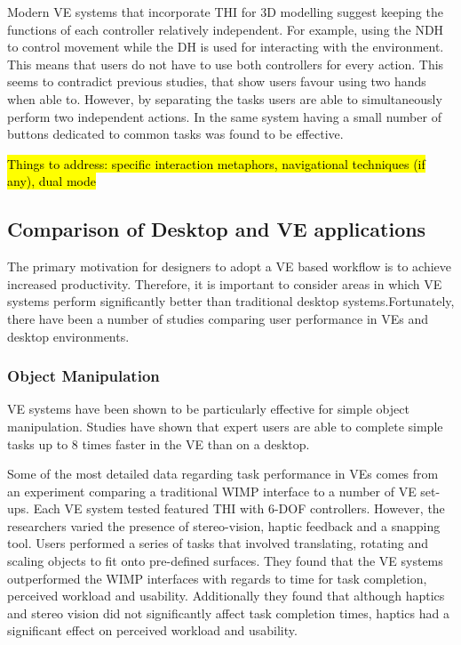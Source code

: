 \documentclass{sig-alternate-05-2015}
\begin{document}
Modern VE systems that incorporate THI for 3D modelling suggest keeping the functions of each controller relatively independent\cite{Mine2014}. For example, using the NDH to control movement while the DH is used for interacting with the environment. This means that users do not have to use both controllers for every action. This seems to contradict previous studies, that show users favour using two hands when able to\cite{Buxton1986,Hinckley1994}. However, by separating the tasks  users are able to simultaneously perform two independent actions.  In the same system having a small number of buttons dedicated to common tasks was found to be effective\cite{Mine2014}.

\hl{Things to address: specific interaction metaphors, navigational techniques (if any), dual mode}
\subsection{Comparison of Desktop and VE applications}
The primary motivation for designers to adopt a VE based workflow is to achieve increased productivity. Therefore, it is important to consider areas in which VE systems perform significantly better than traditional desktop systems.Fortunately, there have been a number of studies comparing user performance in VEs and desktop environments.
\subsubsection{Object Manipulation}
VE systems have been shown to be particularly effective for simple object manipulation. Studies have shown that expert users are able to complete simple tasks up to 8 times faster in the VE than on a desktop\cite{Schultheis2012}.

Some of the most detailed data regarding task performance in VEs comes from an experiment comparing a traditional WIMP interface to a number of VE set-ups. Each VE system tested featured THI with 6-DOF controllers. However, the researchers varied the presence of stereo-vision, haptic feedback and a snapping tool\cite{Scali2003}. Users performed a series of tasks that involved translating, rotating and scaling objects to fit onto pre-defined surfaces. They found that the VE systems outperformed the WIMP interfaces with regards to time for task completion, perceived workload and usability. Additionally they found that although haptics and stereo vision did not significantly affect task completion times, haptics had a significant effect on perceived workload and usability.
\end{document}
